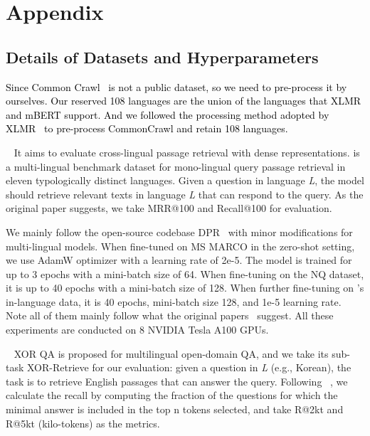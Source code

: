 \section{Appendix}




\subsection{Details of Datasets and Hyperparameters }
\label{ap:finetune}

\textcolor{black}{
 Since Common Crawl~\citep{wenzek2019ccnet} is not a public dataset, so we need to pre-process it by ourselves. Our reserved 108 languages are the union of the languages that XLMR and mBERT support. And we followed the processing method adopted by XLMR~\citep{conneau2019unsupervised} to pre-process CommonCrawl and retain 108 languages.
}

 ~\citep{zhang-etal-2021-mr}
It aims to evaluate cross-lingual passage retrieval with dense representations. \tydi is a multi-lingual benchmark dataset for mono-lingual query passage retrieval in eleven typologically distinct languages. Given a question in language \textit{L}, the model should retrieve relevant texts in language \textit{L} that can respond to the query. As the original paper suggests, we take MRR@100 and Recall@100 for evaluation.

We mainly follow the open-source codebase DPR~\citep{DPR2020} with minor modifications for multi-lingual models. When fine-tuned on MS MARCO in the zero-shot setting, we use AdamW optimizer with a learning rate of 2e-5. The model is trained for up to 3 epochs with a mini-batch size of 64. When fine-tuning on the NQ dataset, it is up to 40 epochs with a mini-batch size of 128.  When further fine-tuning on \tydi's in-language data, it is 40 epochs, mini-batch size 128, and 1e-5 learning rate. Note all of them mainly follow what the original papers~\citep{zhang-etal-2021-mr,zhang2022towards} suggest. All these experiments are conducted on 8 NVIDIA Tesla A100 GPUs. 

 ~\citep{asai-etal-2021-xor}
XOR QA is proposed for multilingual open-domain QA, and we take its sub-task XOR-Retrieve for our evaluation: given a question in \textit{L} (e.g., Korean), the task is to retrieve English passages that can answer the query.  Following ~\citet{asai-etal-2021-xor}, we calculate the recall by computing the fraction of the questions for which the minimal answer is included in the top n tokens selected, and take R@2kt and R@5kt (kilo-tokens) as the metrics.

